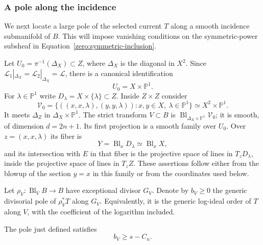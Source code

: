 \subsubsection{A pole along the incidence}

We next locate a large pole of the selected current \(T\) along a smooth
incidence submanifold of \(B\).  This will impose vanishing conditions on the
symmetric-power subsheaf in Equation~\eqref{zero:symmetric-inclusion}.

Let \(U_0=\pi^{-1}(\Delta_X)\subset Z\), where \(\Delta_X\) is the
diagonal in \(X^2\).  Since
\(\mathscr L_1|_{\Delta_X}=\mathscr L_2|_{\Delta_X}=\mathscr L\), there is a
canonical identification
\[
 U_0=X\times\mathbb{P}^1.
\]
For \(\lambda\in\mathbb{P}^1\) write \(D_\lambda=X\times\{\lambda\}\subset Z\).
Inside \(Z\times Z\) consider
\[
 \mathcal V_0
  =\{((x,x,\lambda),(y,y,\lambda)):x,y\in X,\ \lambda\in\mathbb{P}^1\}
  \simeq X^2\times\mathbb{P}^1.
\]
It meets \(\Delta_Z\) in \(\Delta_X\times\mathbb{P}^1\).  The strict transform
\(V\subset B\) is
\(\operatorname{Bl}_{\Delta_X\times\mathbb{P}^1}\mathcal V_0\); it is smooth, of dimension
\(d=2n+1\).  Its first projection is a smooth family over \(U_0\).
Over \(z=(x,x,\lambda)\) its fiber is
\[
 Y=\operatorname{Bl}_xD_\lambda\simeq\operatorname{Bl}_xX,
\]
and its intersection with \(E\) in that fiber is the projective space
of lines in \(T_zD_\lambda\), inside the projective space of lines in
\(T_zZ\).  These assertions follow either from the blowup of the
section \(y=x\) in this family or from the coordinates used below.

Let \(\rho_V:\operatorname{Bl}_VB\to B\) have exceptional divisor \(G_V\).  Denote
by \(b_V\ge0\) the generic divisorial pole of \(\rho_V^*T\) along
\(G_V\).  Equivalently, it is the generic log-ideal order of \(T\)
along \(V\), with the coefficient of the logarithm included.

\begin{lemma}\label{zero:incidence-pole}
The pole just defined satisfies
\begin{equation}\label{zero:pole-transfer}
 b_V\ge s-C_n .
\end{equation}
\end{lemma}

